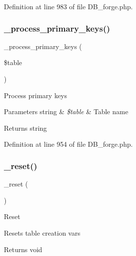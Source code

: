 Definition at line 983 of file D\+B\+\_\+forge.\+php.

\mbox{\label{class_c_i___d_b__forge_a207c32e2b5c14364b2e33d2f15500b7e}} 
\subsubsection{\texorpdfstring{\_process\_primary\_keys()}{\_process\_primary\_keys()}}
{\footnotesize\ttfamily \+\_\+process\+\_\+primary\+\_\+keys (\begin{DoxyParamCaption}\item[{}]{\$table }\end{DoxyParamCaption})\hspace{0.3cm}{\ttfamily [protected]}}

Process primary keys


\begin{DoxyParams}[1]{Parameters}
string & {\em \$table} & Table name \\
\hline
\end{DoxyParams}
\begin{DoxyReturn}{Returns}
string 
\end{DoxyReturn}


Definition at line 954 of file D\+B\+\_\+forge.\+php.

\mbox{\label{class_c_i___d_b__forge_ab90fa1f6f390913fed8670e6535dc180}} 
\subsubsection{\texorpdfstring{\_reset()}{\_reset()}}
{\footnotesize\ttfamily \+\_\+reset (\begin{DoxyParamCaption}{ }\end{DoxyParamCaption})\hspace{0.3cm}{\ttfamily [protected]}}

Reset

Resets table creation vars

\begin{DoxyReturn}{Returns}
void 
\end{DoxyReturn}


